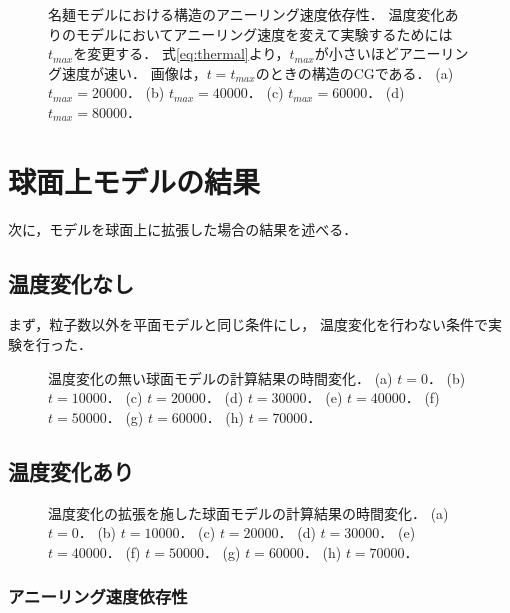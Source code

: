 \begin{figure}
\centering

\caption{
    名麺モデルにおける構造のアニーリング速度依存性．
    温度変化ありのモデルにおいてアニーリング速度を変えて実験するためには$t_{max}$を変更する．
    式\ref{eq:thermal}より，$t_{max}$が小さいほどアニーリング速度が速い．
    画像は，$t=t_{max}$のときの構造のCGである．
    (a) $t_{max}=20000$．
    (b) $t_{max}=40000$．
    (c) $t_{max}=60000$．
    (d) $t_{max}=80000$．
}
\label{fig:result_2d_anearing_speed}
\end{figure}




\section{球面上モデルの結果}

次に，モデルを球面上に拡張した場合の結果を述べる．

\subsection{温度変化なし}

まず，粒子数以外を平面モデルと同じ条件にし，
温度変化を行わない条件で実験を行った．

\begin{figure}
\centering

\caption{
    温度変化の無い球面モデルの計算結果の時間変化．
    (a) $t=0$．
    (b) $t=10000$．
    (c) $t=20000$．
    (d) $t=30000$．
    (e) $t=40000$．
    (f) $t=50000$．
    (g) $t=60000$．
    (h) $t=70000$．
}
\label{fig:result_sphere_without_anearing}
\end{figure}


\subsection{温度変化あり}

\begin{figure}
\centering

\caption{
    温度変化の拡張を施した球面モデルの計算結果の時間変化．
    (a) $t=0$．
    (b) $t=10000$．
    (c) $t=20000$．
    (d) $t=30000$．
    (e) $t=40000$．
    (f) $t=50000$．
    (g) $t=60000$．
    (h) $t=70000$．
}
\label{fig:result_sphere_with_anearing}
\end{figure}

\subsubsection{アニーリング速度依存性}

